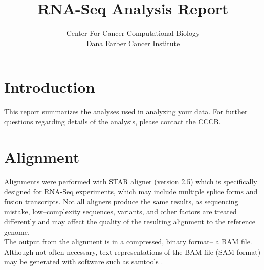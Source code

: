 \documentclass{article}
\title{RNA-Seq Analysis Report}
\author{Center For Cancer Computational Biology \\ Dana Farber Cancer Institute}
\begin{document}
\maketitle

\section{Introduction}
This report summarizes the analyses used in analyzing your data. For further questions regarding details of the analysis, please contact the CCCB.

\section{Alignment}
Alignments were performed with STAR aligner  (version 2.5) \cite{star} which is specifically designed for RNA-Seq experiments, which may include multiple splice forms and fusion transcripts.  Not all aligners produce the same results, as sequencing mistake, low--complexity sequences, variants, and other factors are treated differently and may affect the quality of the resulting alignment to the reference genome.\\

The output from the alignment is in a compressed, binary format-- a BAM file.  Although not often necessary, text representations of the BAM file (SAM format) may be generated with software such as samtools \cite{samtools}.\\
\end{document}
